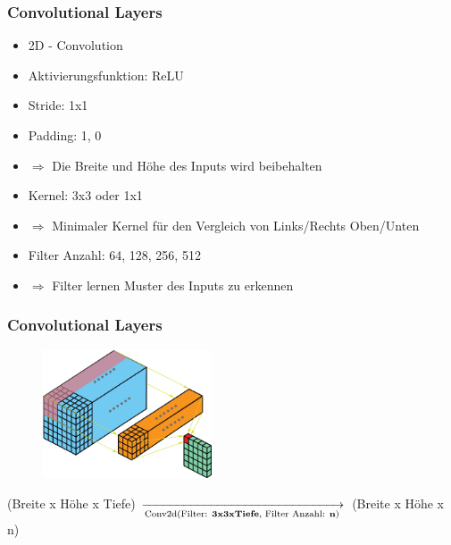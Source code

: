 \documentclass[10pt]{beamer}
\begin{document}
\begin{frame}
\frametitle{Convolutional Layers}
\begin{itemize}
	\setlength\itemsep{1em}
	\item 2D - Convolution
	\item Aktivierungsfunktion: ReLU
	\item Stride: 1x1
	\item Padding: 1, 0
	\item[] $\Rightarrow$ Die Breite und H\"ohe des Inputs wird beibehalten
	\item Kernel: 3x3 oder 1x1
	\item[] $\Rightarrow$ Minimaler Kernel f\"ur den Vergleich von Links/Rechts Oben/Unten
	\item Filter Anzahl: 64, 128, 256, 512
	\item[] $\Rightarrow$ Filter lernen Muster des Inputs zu erkennen 
\end{itemize}
\end{frame}

\begin{frame}
\frametitle{Convolutional Layers}
\begin{figure}
	\includegraphics[width=50mm]{convolution.png}
\end{figure}
(Breite x H\"ohe x Tiefe) 
$\xrightarrow[
	\text{Conv2d(Filter: \textbf{3x3xTiefe}, Filter Anzahl: \textbf{n})}
]{}$
(Breite x H\"ohe x n)
\end{frame}
\end{document}

